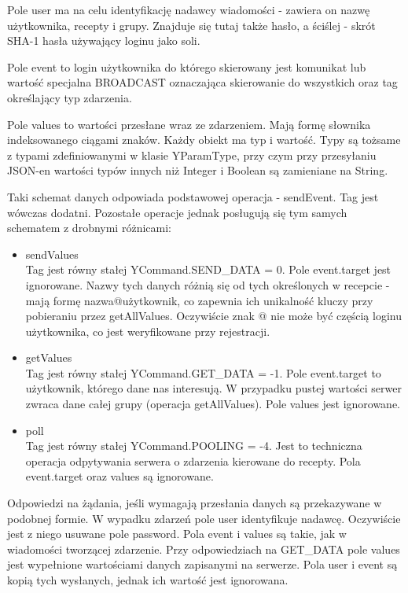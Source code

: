 \documentclass[11pt,a4paper,polish,thesis]{dcsbook}
\begin{document}
Pole user ma na celu identyfikację nadawcy wiadomości - zawiera on nazwę użytkownika, recepty i grupy. Znajduje się tutaj także hasło, a ściślej - skrót SHA-1 hasła używający loginu jako soli. 

Pole event to login użytkownika do którego skierowany jest komunikat lub wartość specjalna BROADCAST oznaczająca skierowanie do wszystkich oraz tag określający typ zdarzenia.

Pole values to wartości przesłane wraz ze zdarzeniem. Mają formę słownika indeksowanego ciągami znaków. Każdy obiekt ma typ i wartość. Typy są tożsame z typami zdefiniowanymi w klasie YParamType, przy czym przy przesyłaniu JSON-en wartości typów innych niż Integer i Boolean są zamieniane na String.

Taki schemat danych odpowiada podstawowej operacja - sendEvent. Tag jest wówczas dodatni.
Pozostałe operacje jednak posługują się tym samych schematem z drobnymi różnicami:
\begin{itemize}
\item{sendValues} \\
Tag jest równy stałej YCommand.SEND\_DATA = 0. Pole event.target jest ignorowane. Nazwy tych danych różnią się od tych określonych w recepcie - mają formę nazwa@użytkownik, co zapewnia ich unikalność kluczy przy pobieraniu przez getAllValues. Oczywiście znak @ nie może być częścią loginu użytkownika, co jest weryfikowane przy rejestracji. 
 \item{getValues} \\
Tag jest równy stałej YCommand.GET\_DATA = -1. Pole event.target to użytkownik, którego dane nas interesują. W przypadku pustej wartości serwer zwraca dane całej grupy (operacja getAllValues). Pole values jest ignorowane.
\item{poll} \\
Tag jest równy stałej YCommand.POOLING = -4. Jest to techniczna operacja odpytywania serwera o zdarzenia kierowane do recepty. Pola event.target oraz values są ignorowane.
\end{itemize}
Odpowiedzi na żądania, jeśli wymagają przesłania danych są przekazywane w podobnej formie.
W wypadku zdarzeń pole user identyfikuje nadawcę. Oczywiście jest z niego usuwane pole password. Pola event i values są takie, jak w wiadomości tworzącej zdarzenie. 
Przy odpowiedziach na GET\_DATA pole values jest wypełnione wartościami danych zapisanymi na serwerze. Pola user i event są kopią tych wysłanych, jednak ich wartość jest ignorowana. 
\end{document}
